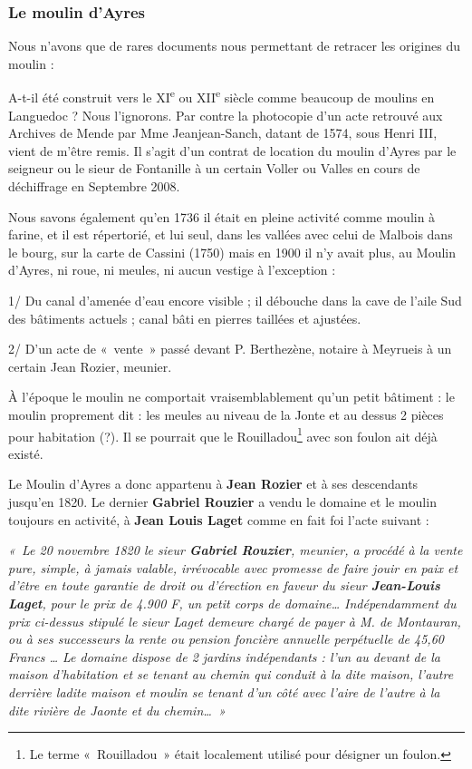 \subsubsection{Le moulin d’Ayres}

Nous n’avons que de rares documents nous permettant de retracer les origines du moulin :

A-t-il été construit vers le XI\textsuperscript{e} ou XII\textsuperscript{e} siècle comme beaucoup de moulins en Languedoc ?
Nous l’ignorons. Par contre la photocopie d’un acte retrouvé aux Archives de Mende par
Mme Jeanjean-Sanch, datant de 1574, sous Henri III, vient de m’être remis. Il s’agit d’un
contrat de location du moulin d’Ayres par le seigneur ou le sieur de Fontanille à un certain
Voller ou Valles en cours de déchiffrage en Septembre 2008.

Nous savons également qu’en 1736 il était en pleine activité comme moulin à farine, et il est
répertorié, et lui seul, dans les vallées avec celui de Malbois dans le bourg, sur la carte de
Cassini (1750) mais en 1900 il n’y avait plus, au Moulin d’Ayres, ni roue, ni meules, ni aucun vestige à l’exception :

1/ Du canal d’amenée d’eau encore visible ; il débouche dans la cave de l’aile Sud des
bâtiments actuels ; canal bâti en pierres taillées et ajustées.

2/ D’un acte de «~vente~» passé devant P. Berthezène, notaire à Meyrueis à un certain Jean Rozier, meunier.

À l’époque le moulin ne comportait vraisemblablement qu’un petit bâtiment : le moulin
proprement dit : les meules au niveau de la Jonte et au dessus 2 pièces pour habitation (?).
Il se pourrait que le Rouilladou\footnote{Le terme «~Rouilladou~» était localement utilisé pour désigner un foulon.} avec son foulon ait déjà existé.

Le Moulin d’Ayres a donc appartenu à \textbf{Jean Rozier} et à ses descendants jusqu’en 1820.
Le dernier \textbf{Gabriel Rouzier} a vendu le domaine et le moulin toujours en activité, à \textbf{Jean
Louis Laget} comme en fait foi l’acte suivant :

\begin{flushleft}
\hspace{1cm}
\parbox{0.82\textwidth}{
\textit{
«~Le 20 novembre 1820 le sieur \textbf{Gabriel Rouzier}, meunier, a procédé à la vente pure,
simple, à jamais valable, irrévocable avec promesse de faire jouir en paix et d’être en toute garantie
de droit ou d’érection en faveur du sieur \textbf{Jean-Louis Laget}, pour le prix de 4.900 F, un
petit corps de domaine…
Indépendamment du prix ci-dessus stipulé le sieur Laget demeure chargé de payer à M. de
Montauran, ou à ses successeurs la rente ou pension foncière annuelle perpétuelle de 45,60
Francs …
Le domaine dispose de 2 jardins indépendants : l’un au devant de la maison d’habitation et se
tenant au chemin qui conduit à la dite maison, l’autre derrière ladite maison et moulin se tenant
d’un côté avec l’aire de l’autre à la dite rivière de Jaonte et du chemin…~»}
}
\end{flushleft}

